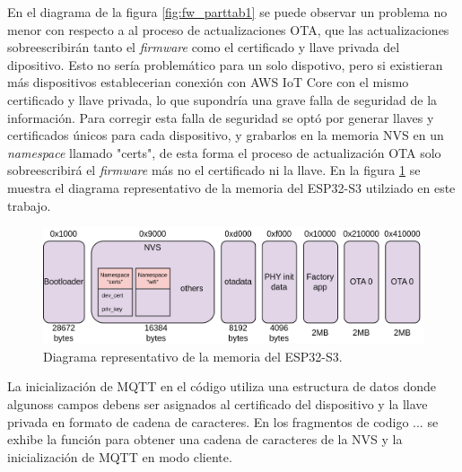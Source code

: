 En el diagrama de la figura \ref{fig:fw_parttab1} se puede observar un problema no menor con respecto a al proceso de actualizaciones OTA, que las actualizaciones sobreescribirán tanto el \textit{firmware} como el certificado y llave privada del dipositivo. Esto no sería problemático para un solo dispotivo, pero si existieran más dispositivos establecerian conexión con AWS IoT Core con el mismo certificado y llave privada, lo que supondría una grave falla de seguridad de la información. Para corregir esta falla de seguridad se optó por generar llaves y certificados únicos para cada dispositivo, y grabarlos en la memoria NVS en un \textit{namespace} llamado "certs", de esta forma el proceso de actualización OTA solo sobreescribirá el \textit{firmware} más no el certificado ni la llave. En la figura \ref{fig:fw_parttab2} se muestra el diagrama representativo de la memoria del ESP32-S3 utilziado en este trabajo.

\begin{figure}[h]
	\centering
	\includegraphics[scale=0.22]{./Figures/fw_parttab2.png}
	\caption{Diagrama representativo de la memoria del ESP32-S3.}
	\label{fig:fw_parttab2}
\end{figure}

La inicialización de MQTT en el código utiliza una estructura de datos donde algunoss campos debens ser asignados al certificado del dispositivo y la llave privada en formato de cadena de caracteres. En los fragmentos de codigo ... se exhibe la función para obtener una cadena de caracteres de la NVS y la inicialización de MQTT en modo cliente.

